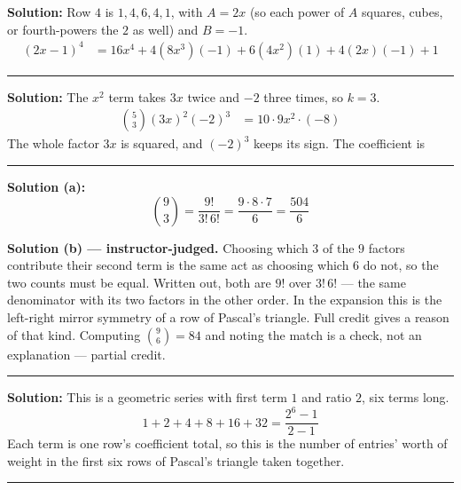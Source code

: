 \documentclass[12pt]{article}
\begin{document}
\textbf{Solution:} Row $4$ is $1, 4, 6, 4, 1$, with $A = 2x$ (so each power of $A$ squares,
cubes, or fourth-powers the $2$ as well) and $B = -1$.
\begin{align*}
  (2x - 1)^4 &= 16x^4 + 4(8x^3)(-1) + 6(4x^2)(1) + 4(2x)(-1) + 1
\end{align*}

\vspace{0.2cm}\noindent\rule{\linewidth}{0.2pt}


\textbf{Solution:} The $x^2$ term takes $3x$ twice and $-2$ three times, so $k = 3$.
\begin{align*}
  \binom{5}{3}(3x)^2(-2)^3 &= 10 \cdot 9x^2 \cdot (-8)
\end{align*}
The whole factor $3x$ is squared, and $(-2)^3$ keeps its sign. The coefficient is

\vspace{0.2cm}\noindent\rule{\linewidth}{0.2pt}


\textbf{Solution (a):}
\[ \binom{9}{3} = \frac{9!}{3!\,6!} = \frac{9 \cdot 8 \cdot 7}{6} = \frac{504}{6} \]

\vspace{0.15cm}
\textbf{Solution (b) --- instructor-judged.} Choosing which $3$ of the $9$ factors contribute
their second term is the same act as choosing which $6$ do not, so the two counts must be
equal. Written out, both are $9!$ over $3!\,6!$ --- the same denominator with its two factors
in the other order. In the expansion this is the left-right mirror symmetry of a row of
Pascal's triangle. Full credit gives a reason of that kind. Computing $\binom{9}{6} = 84$ and
noting the match is a check, not an explanation --- partial credit.

\vspace{0.2cm}\noindent\rule{\linewidth}{0.2pt}


\textbf{Solution:} This is a geometric series with first term $1$ and ratio $2$, six terms
long.
\[ 1 + 2 + 4 + 8 + 16 + 32 = \frac{2^6 - 1}{2 - 1} \]
Each term is one row's coefficient total, so this is the number of entries' worth of weight
in the first six rows of Pascal's triangle taken together.

\vspace{0.2cm}\noindent\rule{\linewidth}{0.2pt}
\end{document}
